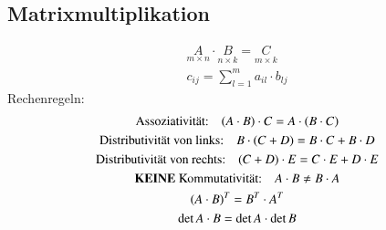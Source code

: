 \subsection{Matrixmultiplikation}
\begin{gather}
  \underset{m\times n}{A}\cdot\underset{n\times k}{B} = \underset{m\times k}{C} \\
  c_{ij} = \sum_{l=1}^m a_{il}\cdot b_{lj}
\end{gather}
Rechenregeln:
\begin{gather}
  \text{Assoziativit\"at:} \quad (A\cdot B)\cdot C = A\cdot(B\cdot C) \\
  \text{Distributivit\"at von links:} \quad B\cdot(C+D) = B\cdot C + B\cdot D \\
  \text{Distributivit\"at von rechts:} \quad (C+D)\cdot E = C\cdot E + D\cdot E \\
  \text{\textbf{KEINE} Kommutativit\"at:} \quad A\cdot B \neq B\cdot A \\
  {(A \cdot B)}^T = B^T \cdot A^T \\
  \det{A\cdot B} = \det{A}\cdot\det{B}
\end{gather}


